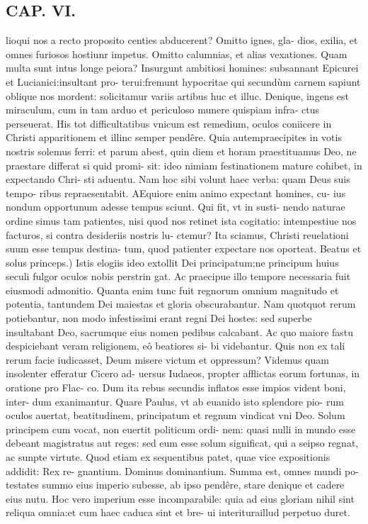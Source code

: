 \documentclass{article}
\begin{document}
\begin{pages}
\section*{CAP. VI. }
\marginpar{[ p.81 ]}\pstart lioqui nos a recto proposito centies abducerent? Omitto ignes, gla- dios, exilia, et omnes furiosos hostiunr impetus. Omitto calumnias, et alias vexationes. Quam multa sunt intus longe peiora? Insurgunt ambitiosi homines: subsannant Epicurei et Lucianici:insultant pro- terui:fremunt hypocritae qui secundùm carnem sapiunt oblique nos mordent: solicitamur variis artibus huc et illuc. Denique, ingens est miraculum, cum in tam arduo et periculoso munere quispiam infra- ctus perseuerat. His tot difficultatibus vnicum est remedium, oculos coniicere in Christi apparitionem et illinc semper pendêre. Quia autempraecipites in votis nostris solemus ferri: et parum abest, quin diem et horam praestituamus Deo, ne praestare differat si quid promi- sit: ideo nimiam festinationem mature cohibet, in expectando Chri- sti aduentu. Nam hoc sibi volunt haec verba: quam Deus suis tempo- ribus repraesentabit. AEquiore enim animo expectant homines, cu- ius nondum opportunum adesse tempus sciunt. Qui fit, vt in susti- nendo naturae ordine simus tam patientes, nisi quod nos retinet ista cogitatio: intempestiue nos facturos, si contra desideriis nostris lu- ctemur? Ita sciamus, Christi reuelationi suum esse tempus destina- tum, quod patienter expectare nos oporteat.  \pend\pstart Beatus et solus princeps.) Istis elogiis ideo extollit Dei principatum;ne principum huius seculi fulgor oculos nobis perstrin gat. Ac praecipue illo tempore necessaria fuit eiusmodi admonitio. Quanta enim tunc fuit regnorum omnium magnitudo et potentia, tantundem Dei maiestas et gloria obscurabantur. Nam quotquot rerum potiebantur, non modo infestissimi erant regni Dei hostes: sed superbe insultabant Deo, sacrumque eius nomen pedibus calcabant. Ac quo maiore fastu despiciebant veram religionem, eô beatiores si- bi videbantur. Quis non ex tali rerum facie iudicasset, Deum misere victum et oppressum? Videmus quam insolenter efferatur Cicero ad- uersus Iudaeos, propter afflictas eorum fortunas, in oratione pro Flac- co. Dum ita rebus secundis inflatos esse impios vident boni, inter- dum exanimantur. Quare Paulus, vt ab euanido isto splendore pio- rum oculos auertat, beatitudinem, principatum et regnum vindicat vni Deo. Solum principem cum vocat, non euertit politicum ordi- nem: quasi nulli in mundo esse debeant magistratus aut reges: sed eum esse solum significat, qui a seipso regnat, ac sunpte virtute. Quod etiam ex sequentibus patet, quae vice expositionis addidit: Rex re- gnantium. Dominus dominantium. Summa est, omnes mundi po- testates summo eius imperio subesse, ab ipso pendêre, stare denique et cadere eius nutu. Hoc vero imperium esse incomparabile: quia ad eius gloriam nihil sint reliqua omnia:et cum haec caduca sint et bre- ui interituraillud perpetuo duret.  \pend

\end{pages}
\end{document}
